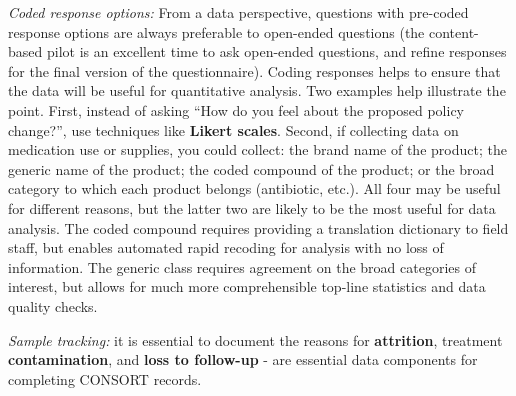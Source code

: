 \textit{Coded response options:}
From a data perspective, questions with pre-coded response options are always preferable to open-ended questions (the content-based pilot is an excellent time to ask open-ended questions, and refine responses for the final version of the questionnaire). Coding responses helps to ensure that the data will be useful for quantitative analysis. Two examples help illustrate the point. First, instead of asking ``How do you feel about the proposed policy change?'', use techniques like 
\textbf{Likert scales}. Second, if collecting data on medication use or supplies, you could collect: the brand name of the product; the generic name of the product; the coded compound of the product; or the broad category to which each product belongs (antibiotic, etc.). All four may be useful for different reasons, but the latter two are likely to be the most useful for data analysis. The coded compound requires providing a translation dictionary to field staff, but enables automated rapid recoding for analysis with no loss of information. The generic class requires agreement on the broad categories of interest, but allows for much more comprehensible top-line statistics and data quality checks.

\textit{Sample tracking:} it is essential to document the reasons for \textbf{attrition}, treatment \textbf{contamination}, and \textbf{loss to follow-up}  -
 are essential data components for completing CONSORT records. 

